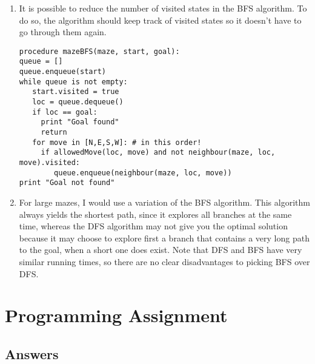 \documentclass[a4paper]{article}
\begin{document}
\begin{enumerate}
\begin{enumerate}
\item It is possible to reduce the number of visited states in the BFS algorithm. To do so, the algorithm should keep track of visited states so it doesn't have to go through them again.

\begin{lstlisting}[style = stdio]
procedure mazeBFS(maze, start, goal):
queue = []
queue.enqueue(start)
while queue is not empty:
   start.visited = true
   loc = queue.dequeue()
   if loc == goal:
     print "Goal found"
     return
   for move in [N,E,S,W]: # in this order!          
     if allowedMove(loc, move) and not neighbour(maze, loc, move).visited:
        queue.enqueue(neighbour(maze, loc, move))
print "Goal not found"
\end{lstlisting}
\item For large mazes, I would use a variation of the  BFS algorithm. This algorithm always yields the shortest path, since it explores all branches at the same time, whereas the DFS algorithm may not give you the optimal solution because it may choose to explore first a branch that contains a very long path to the goal, when a short one does exist. Note that DFS and BFS have very similar running times, so there are no clear disadvantages to picking BFS over DFS.
\end{enumerate}
\end{enumerate}

\section{Programming Assignment}
\subsection{Answers}
\end{document}
